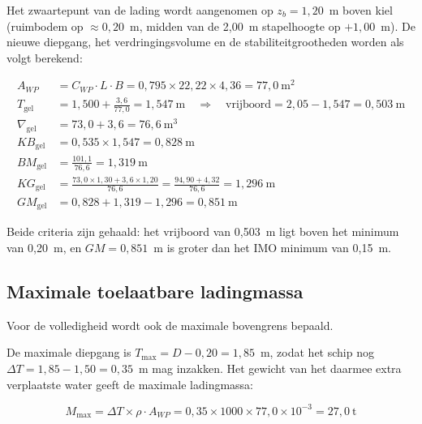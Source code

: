 Het zwaartepunt van de lading wordt aangenomen op $z_b = 1{,}20$~m boven
kiel (ruimbodem op $\approx 0{,}20$~m, midden van de 2{,}00~m stapelhoogte
op $+1{,}00$~m). De nieuwe diepgang, het verdringingsvolume en de
stabiliteitgrootheden worden als volgt berekend:

\begin{align}
    A_{WP}              &= C_{WP} \cdot L \cdot B
                         = 0{,}795 \times 22{,}22 \times 4{,}36
                         = 77{,}0\ \mathrm{m^2} \\[4pt]
    T_\mathrm{gel}      &= 1{,}500 + \frac{3{,}6}{77{,}0}
                         = 1{,}547\ \mathrm{m}
                         \quad\Rightarrow\quad
                         \text{vrijboord} = 2{,}05 - 1{,}547 = 0{,}503\ \mathrm{m}
                         \\[4pt]
    \nabla_\mathrm{gel} &= 73{,}0 + 3{,}6 = 76{,}6\ \mathrm{m^3} \\[4pt]
    KB_\mathrm{gel}     &= 0{,}535 \times 1{,}547 = 0{,}828\ \mathrm{m} \\[4pt]
    BM_\mathrm{gel}     &= \frac{101{,}1}{76{,}6}  = 1{,}319\ \mathrm{m} \\[4pt]
    KG_\mathrm{gel}     &= \frac{73{,}0 \times 1{,}30 + 3{,}6 \times 1{,}20}
                               {76{,}6}
                         = \frac{94{,}90 + 4{,}32}{76{,}6}
                         = 1{,}296\ \mathrm{m} \\[4pt]
    GM_\mathrm{gel}     &= 0{,}828 + 1{,}319 - 1{,}296
                         = \boxed{0{,}851\ \mathrm{m}}
\end{align}

Beide criteria zijn gehaald: het vrijboord van 0{,}503~m ligt
 boven het minimum van 0{,}20~m, en $GM = 0{,}851$~m is
groter dan het IMO minimum van 0{,}15~m.

\subsection{Maximale toelaatbare ladingmassa}

Voor de volledigheid wordt ook de maximale bovengrens bepaald. 

De maximale diepgang is $T_\mathrm{max} = D - 0{,}20 = 1{,}85$~m,
zodat het schip nog $\Delta T = 1{,}85 - 1{,}50 = 0{,}35$~m mag inzakken.
Het gewicht van het daarmee extra verplaatste water geeft de maximale
ladingmassa:

\begin{equation}
    M_\mathrm{max} = \Delta T \times \rho \cdot A_{WP}
                   = 0{,}35 \times 1000 \times 77{,}0 \times 10^{-3}
                   = \boxed{27{,}0\ \mathrm{t}}
    \label{eq:Mmax}
\end{equation}

